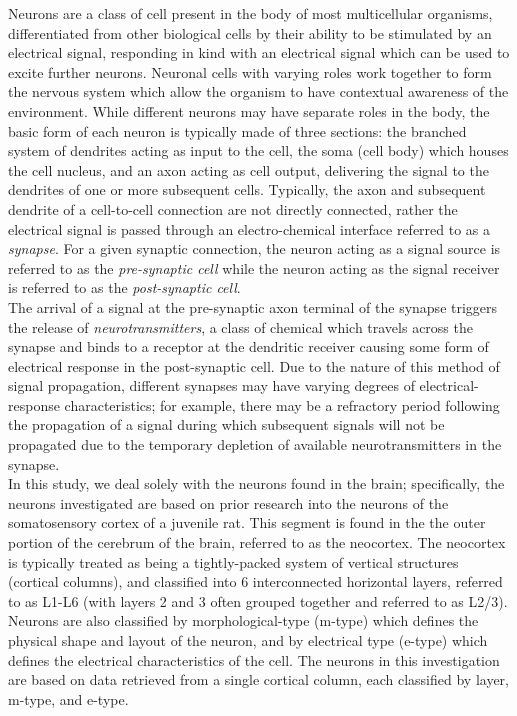 \documentclass[letterpaper, 10 pt, conference]{ieeeconf}  %
\begin{document}
Neurons are a class of cell present in the body of most multicellular organisms, differentiated from other biological cells by their ability to be stimulated by an electrical signal, responding in kind with an electrical signal which can be used to excite further neurons. Neuronal cells with varying roles work together to form the nervous system which allow the organism to have contextual awareness of the environment. While different neurons may have separate roles in the body, the basic form of each neuron is typically made of three sections: the branched system of dendrites acting as input to the cell, the soma (cell body) which houses the cell nucleus, and an axon acting as cell output, delivering the signal to the dendrites of one or more subsequent cells. Typically, the axon and subsequent dendrite of a cell-to-cell connection are not directly connected, rather the electrical signal is passed through an electro-chemical interface referred to as a \emph{synapse}. For a given synaptic connection, the neuron acting as a signal source is referred to as the \emph{pre-synaptic cell} while the neuron acting as the signal receiver is referred to as the \emph{post-synaptic cell}.\\
The arrival of a signal at the pre-synaptic axon terminal of the synapse triggers the release of \emph{neurotransmitters}, a class of chemical which travels across the synapse and binds to a receptor at the dendritic receiver causing some form of electrical response in the post-synaptic cell. Due to the nature of this method of signal propagation, different synapses may have varying degrees of electrical-response characteristics; for example, there may be a refractory period following the propagation of a signal during which subsequent signals will not be propagated due to the temporary depletion of available neurotransmitters in the synapse. \\
In this study, we deal solely with the neurons found in the brain; specifically, the neurons investigated are based on prior research into the neurons of the somatosensory cortex of a juvenile rat. This segment is found in the the outer portion of the cerebrum of the brain, referred to as the neocortex. The neocortex is typically treated as being a tightly-packed system of vertical structures (cortical columns), and classified into 6 interconnected horizontal layers, referred to as L1-L6 (with layers 2 and 3 often grouped together and referred to as L2/3). Neurons are also classified by morphological-type (m-type) which defines the physical shape and layout of the neuron, and by electrical type (e-type) which defines the electrical characteristics of the cell. The neurons in this investigation are based on data retrieved from a single cortical column, each classified by layer, m-type, and e-type.\\
\end{document}
